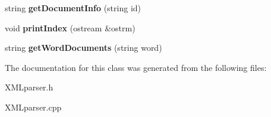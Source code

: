 \begin{DoxyCompactItemize}
\item 
\hypertarget{class_x_m_l_parser_a81d19002a11d39c348bd584a3a84a1fc}{string {\bfseries get\+Document\+Info} (string id)}\label{class_x_m_l_parser_a81d19002a11d39c348bd584a3a84a1fc}

\item 
\hypertarget{class_x_m_l_parser_aca2e21fa1da16b0060a185bf83e8ea78}{void {\bfseries print\+Index} (ostream \&ostrm)}\label{class_x_m_l_parser_aca2e21fa1da16b0060a185bf83e8ea78}

\item 
\hypertarget{class_x_m_l_parser_a92748c36a754b03d91996a5f390ea14f}{string {\bfseries get\+Word\+Documents} (string word)}\label{class_x_m_l_parser_a92748c36a754b03d91996a5f390ea14f}

\end{DoxyCompactItemize}


The documentation for this class was generated from the following files\+:\begin{DoxyCompactItemize}
\item 
X\+M\+Lparser.\+h\item 
X\+M\+Lparser.\+cpp\end{DoxyCompactItemize}
